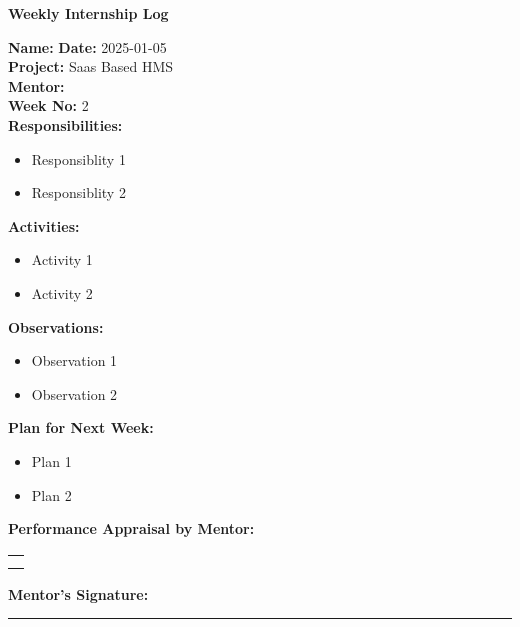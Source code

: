 \begin{center}
  \bfseries Weekly Internship Log
\end{center}

\noindent
\textbf{Name:}  \hfill \textbf{Date:} 2025-01-05 \\
\textbf{Project:} Saas Based HMS \hfill \\
\textbf{Mentor:}   \\
\textbf{Week No:} 2 \\

\noindent
\textbf{Responsibilities:}
\begin{itemize}
    \item Responsiblity 1
    \item Responsiblity 2
\end{itemize}

\noindent
\textbf{Activities:}
\begin{itemize}
    \item Activity 1
    \item Activity 2
\end{itemize}

\noindent
\textbf{Observations:}
\begin{itemize}
    \item Observation 1
    \item Observation 2
\end{itemize}

\noindent
\textbf{Plan for Next Week:}
\begin{itemize}
    \item  Plan 1
    \item Plan 2
\end{itemize}

\noindent
\textbf{Performance Appraisal by Mentor:} \\
\begin{table}[h]
    \centering
    \noindent
    \begin{tabularx}{\textwidth} { 
        | >{\centering\arraybackslash}X| }

        \hline
          \\ \\       	                    
        \hline
    \end{tabularx}
\end{table}


\vspace{2em}
\noindent
\textbf{Mentor’s Signature:} \\
\rule{0.4\textwidth}{0.5pt}
